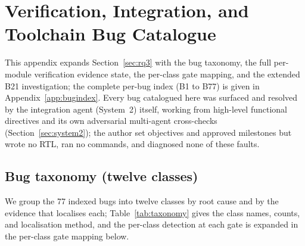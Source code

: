 \section{Verification, Integration, and Toolchain Bug Catalogue}\label{app:bugs}

This appendix expands Section~\ref{sec:rq3} with the bug taxonomy, the full per-module verification evidence state, the per-class gate mapping, and the extended B21 investigation; the complete per-bug index (B1 to B77) is given in Appendix~\ref{app:bugindex}. Every bug catalogued here was surfaced and resolved by the integration agent (System~2) itself, working from high-level functional directives and its own adversarial multi-agent cross-checks (Section~\ref{sec:system2}); the author set objectives and approved milestones but wrote no RTL, ran no commands, and diagnosed none of these faults.

\subsection{Bug taxonomy (twelve classes)}

We group the 77 indexed bugs into twelve classes by root cause and by the evidence that localises each; Table~\ref{tab:taxonomy} gives the class names, counts, and localisation method, and the per-class detection at each gate is expanded in the per-class gate mapping below.

